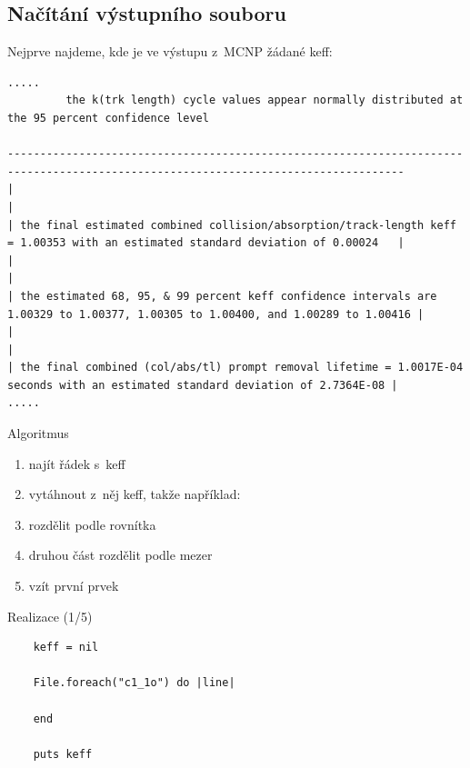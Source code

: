\documentclass{beamer}
\begin{document}
\subsection{Načítání výstupního souboru}

\begin{frame}[fragile]{}
  Nejprve najdeme, kde je ve výstupu z~MCNP žádané keff:
  {\tiny
  \begin{verbatim}
.....
         the k(trk length) cycle values appear normally distributed at the 95 percent confidence level

-----------------------------------------------------------------------------------------------------------------------------------
|                                                                                                                                 |
| the final estimated combined collision/absorption/track-length keff = 1.00353 with an estimated standard deviation of 0.00024   |
|                                                                                                                                 |
| the estimated 68, 95, & 99 percent keff confidence intervals are 1.00329 to 1.00377, 1.00305 to 1.00400, and 1.00289 to 1.00416 |
|                                                                                                                                 |
| the final combined (col/abs/tl) prompt removal lifetime = 1.0017E-04 seconds with an estimated standard deviation of 2.7364E-08 |
.....
  \end{verbatim}
  }
\end{frame}

\begin{frame}{Algoritmus}
  \begin{enumerate}
    \item najít řádek s~keff
    \pause
    \item vytáhnout z~něj keff, takže například:
    \pause
    \item rozdělit podle rovnítka
    \pause
    \item druhou část rozdělit podle mezer
    \pause
    \item vzít první prvek
  \end{enumerate}
\end{frame}


\begin{frame}[fragile]{Realizace (1/5)}
  \scriptsize
  \begin{verbatim}
    keff = nil

    File.foreach("c1_1o") do |line|

    end

    puts keff
  \end{verbatim}
\end{frame}
\end{document}
